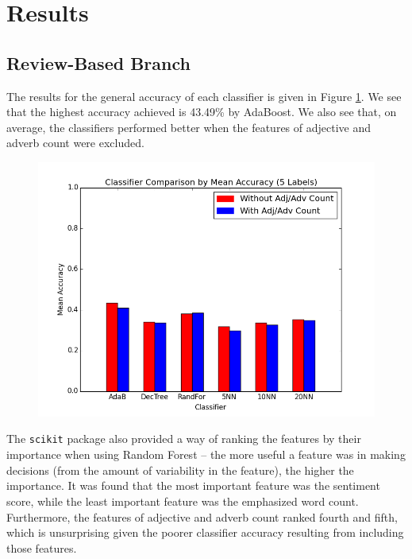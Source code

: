 \section{Results}

\subsection{Review-Based Branch}
The results for the general accuracy of each classifier is given in Figure \ref{accuracy}. We see that the highest accuracy achieved is 43.49\% by AdaBoost. We also see that, on average, the classifiers performed better when the features of adjective and adverb count were excluded.

\begin{figure}[!h]
\centering
\includegraphics[scale=0.5]{compaccuracy}
\caption{}
\label{accuracy}
\end{figure}

The \texttt{scikit} package also provided a way of ranking the features by their importance when using Random Forest -- the more useful a feature was in making decisions (from the amount of variability in the feature), the higher the importance. It was found that the most important feature was the sentiment score, while the least important feature was the emphasized word count. Furthermore, the features of adjective and adverb count ranked fourth and fifth, which is unsurprising given the poorer classifier accuracy resulting from including those features.

